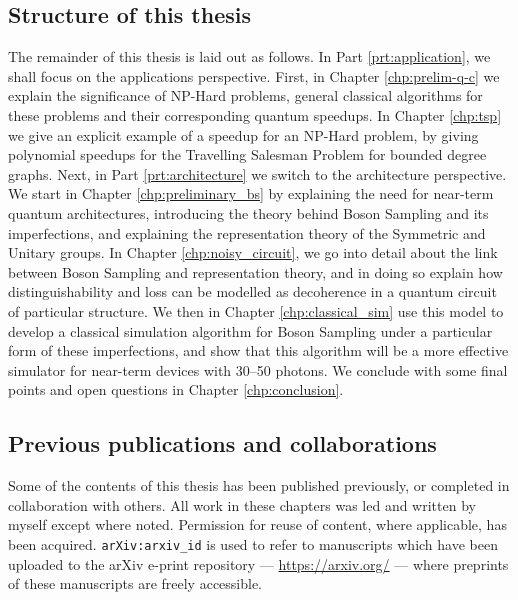 \subsection{Structure of this thesis}

The remainder of this thesis is laid out as follows. In Part \ref{prt:application}, we shall focus on the applications perspective. First, in Chapter \ref{chp:prelim-q-c} we explain the significance of NP-Hard problems, general classical algorithms for these problems and their corresponding quantum speedups. In Chapter \ref{chp:tsp} we give an explicit example of a speedup for an NP-Hard problem, by giving polynomial speedups for the Travelling Salesman Problem for bounded degree graphs. Next, in Part \ref{prt:architecture} we switch to the architecture perspective. We start in Chapter \ref{chp:preliminary_bs} by explaining the need for near-term quantum architectures, introducing the theory behind Boson Sampling and its imperfections, and explaining the representation theory of the Symmetric and Unitary groups. In Chapter \ref{chp:noisy_circuit}, we go into detail about the link between Boson Sampling and representation theory, and in doing so explain how distinguishability and loss can be modelled as decoherence in a quantum circuit of particular structure. We then in Chapter \ref{chp:classical_sim} use this model to develop a classical simulation algorithm for Boson Sampling under a particular form of these imperfections, and show that this algorithm will be a more effective simulator for near-term devices with 30--50 photons. We conclude with some final points and open questions in Chapter \ref{chp:conclusion}.

\subsection{Previous publications and collaborations}

Some of the contents of this thesis has been published previously, or completed in collaboration with others. All work in these chapters was led and written by myself except where noted. Permission for reuse of content, where applicable, has been acquired. {\tt arXiv:arxiv\_id} is used to refer to manuscripts which have been uploaded to the arXiv e-print repository --- \url{https://arxiv.org/} --- where preprints of these manuscripts are freely accessible.


